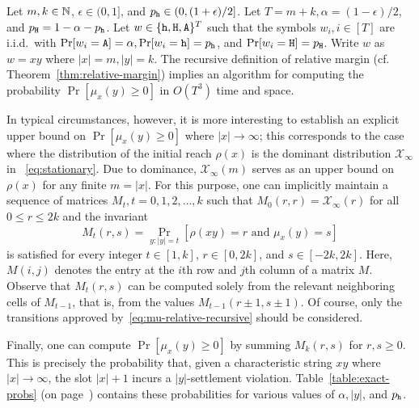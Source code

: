 Let $m, k \in \mathbb{N}$, $\epsilon \in (0,1]$, and $p_{\mathtt{h}} \in (0, (1+\epsilon)/2]$.
Let $T = m + k, \alpha = (1 - \epsilon)/2$, and $p_{\mathtt{H}} = 1 - \alpha - p_{\mathtt{h}}$. 
Let $w \in \{\mathtt{h}, \mathtt{H}, \mathtt{A}\}^T$ such that 
the symbols $w_i, i \in [T]$ are i.i.d.\, with 
$\Pr[w_i = \mathtt{A}] = \alpha, \Pr[w_i = \mathtt{h}] = p_{\mathtt{h}}$, and $\Pr[w_i = \mathtt{H}] = p_{\mathtt{H}}$. 
Write $w$ as $w = xy$ where $|x| = m, |y| = k$.
The recursive definition of relative margin 
(cf. Theorem~\ref{thm:relative-margin}) 
implies an algorithm for computing the probability
$\Pr[\mu_x(y) \geq 0]$ 
in $O(T^3)$ time and space. 

In typical circumstances, however, it is more interesting to establish an
explicit upper bound on $\Pr[\mu_x(y) \geq 0]$ where
$|x| \rightarrow \infty$; this corresponds to the case where the
distribution of the initial reach $\rho(x)$ is the dominant distribution
$\mathcal{X}_\infty$ in 
~\eqref{eq:stationary}. 
Due to dominance, $\mathcal{X}_\infty(m)$ serves as an
upper bound on $\rho(x)$ for any finite $m = |x|$. 
For this purpose, one can implicitly
maintain a sequence of matrices $M_t, t = 0, 1, 2, \ldots, k$
such that $M_0(r, r) = \mathcal{X}_\infty(r)$ for all $0 \leq r \leq 2k$ and
the invariant
\[
  M_t(r, s) = \Pr_{y: |y| = t}[\rho(xy) = r \text{ and }
  \mu_x(y) = s ]
\]
is satisfied for every integer $t \in [1, k]$,
$r \in [0, 2k]$, and $s \in [-2k, 2k]$. 
Here, $M(i,j)$ denotes the entry at the $i$th row and $j$th column of a matrix $M$.
Observe that $M_t(r,s)$ can be computed solely 
from the relevant neighboring cells of $M_{t-1}$, that is, 
from the values $M_{t-1}(r\pm 1, s \pm 1)$. 
Of course, only the transitions approved by~\eqref{eq:mu-relative-recursive} should be considered.

Finally, one can compute $\Pr[\mu_x(y) \geq 0]$ by summing $M_k(r,s)$ for
$r, s \geq 0$. 
This is precisely the probability that, 
given a characteristic string $xy$ where $|x| \rightarrow \infty$, 
the slot $|x| + 1$ incurs a $|y|$-settlement violation. 
Table~\ref{table:exact-probs} (on page~\pageref{table:exact-probs}) contains these probabilities for various values of $\alpha, |y|$, and $p_{\mathtt{h}}$. 


